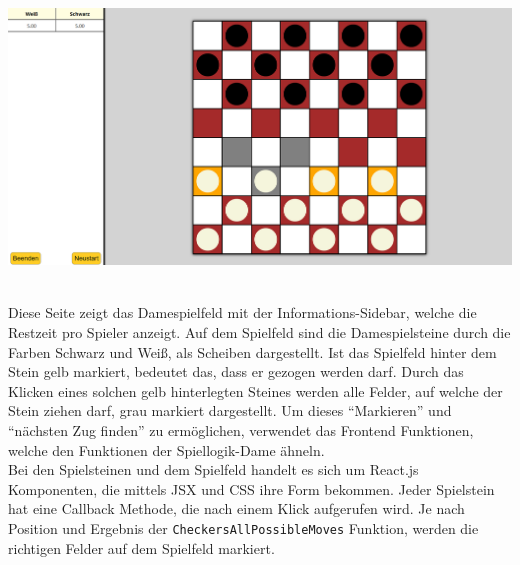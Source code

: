 \documentclass[12pt,a4paper,bibliography=totocnumbered,listof=totocnumbered]{article}
\begin{document}
\vspace{1em}
\begin{minipage}{\linewidth}
	\centering
	\includegraphics[width=0.7\linewidth]{pics/DameWebsiteSpiel.png}
	\label{fig:DameSpielSeite}
\end{minipage}
\\

Diese Seite zeigt das Damespielfeld mit der Informations-Sidebar, welche die Restzeit pro Spieler anzeigt.
Auf dem Spielfeld sind die Damespielsteine durch die Farben Schwarz und Weiß, als Scheiben dargestellt. 
Ist das Spielfeld hinter dem Stein gelb markiert, bedeutet das, dass er gezogen werden darf. 
Durch das Klicken eines solchen gelb hinterlegten Steines werden alle Felder, auf welche der Stein ziehen darf,
grau markiert dargestellt. Um dieses ``Markieren'' und ``nächsten Zug finden'' zu ermöglichen, verwendet das Frontend Funktionen,
welche den Funktionen der Spiellogik-Dame ähneln.
\\
Bei den Spielsteinen und dem Spielfeld handelt es sich um React.js Komponenten, die mittels JSX und CSS ihre Form bekommen.
Jeder Spielstein hat eine Callback Methode, die nach einem Klick aufgerufen wird. Je nach Position und 
Ergebnis der \texttt{CheckersAllPossibleMoves} Funktion, werden die richtigen Felder auf dem Spielfeld markiert.
\end{document}
